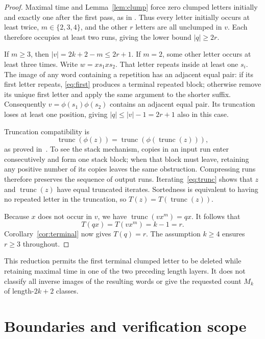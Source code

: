 \documentclass[11pt,a4paper]{article}
\DeclareMathOperator{\trunc}{trunc}
\begin{document}
\begin{proof}
Maximal time and Lemma~\ref{lem:clump} force zero clumped letters initially
and exactly one after the first pass, as in
\cite[Corollary 2.2]{ChoiGanLiZhu2025}. Thus every letter initially occurs
at least twice, $m\in\{2,3,4\}$, and the other $r$ letters are all
unclumped in $v$. Each therefore occupies at least two runs, giving the
lower bound $|q|\geq2r$.

If $m\geq3$, then $|v|=2k+2-m\leq2r+1$. If $m=2$, some other letter
occurs at least three times. Write $w=x s_1 x s_2$. That letter repeats
inside at least one $s_i$. The image of any word containing a repetition
has an adjacent equal pair: if its first letter repeats,
\eqref{eq:first} produces a terminal repeated block; otherwise remove its
unique first letter and apply the same argument to the shorter suffix.
Consequently $v=\phi(s_1)\phi(s_2)$ contains an adjacent equal pair. Its
truncation loses at least one position, giving
$|q|\leq |v|-1=2r+1$ also in this case.

Truncation compatibility is
\begin{equation}\label{eq:trunc}
 \trunc(\phi(z))=\trunc(\phi(\trunc(z))),
\end{equation}
as proved in~\cite[Proposition 3.1]{ChoiGanLiZhu2025}. To see the stack
mechanism, copies in an input run enter consecutively and form one stack
block; when that block must leave, retaining any positive number of its
copies leaves the same obstruction. Compressing runs therefore preserves
the sequence of output runs. Iterating~\eqref{eq:trunc} shows that $z$ and
$\trunc(z)$ have equal truncated iterates. Sortedness is equivalent to
having no repeated letter in the truncation, so
$T(z)=T(\trunc(z))$.

Because $x$ does not occur in $v$, we have $\trunc(vx^m)=qx$. It follows
that
\[
 T(qx)=T(vx^m)=k-1=r.
\]
Corollary~\ref{cor:terminal} now gives $T(q)=r$. The assumption $k\geq4$
ensures $r\geq3$ throughout.
\end{proof}

This reduction permits the first terminal clumped letter to be deleted
while retaining maximal time in one of the two preceding length layers.
It does not classify all inverse images of the resulting words or give
the requested count $M_k$ of length-$2k+2$ classes.

\section{Boundaries and verification scope}
\end{document}
